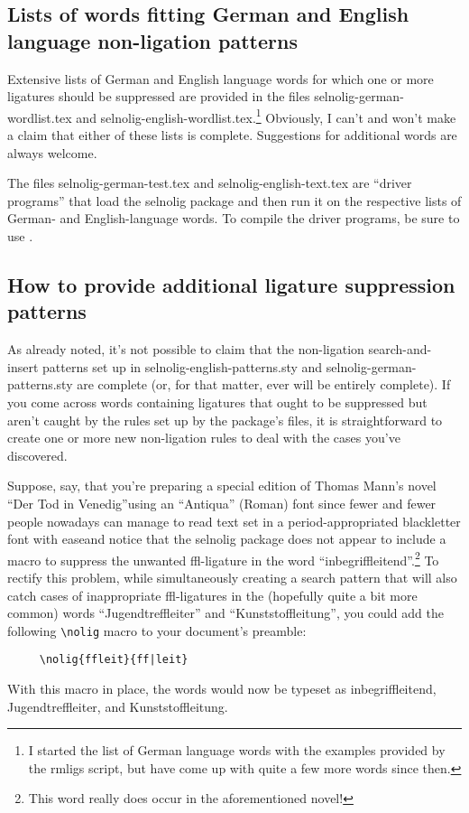 \documentclass[12pt]{article}
\newcommand{\pkg}[1]{\textsf{#1}}
\begin{document}
\subsection{Lists of words fitting German and English language non-ligation patterns}

Extensive lists of German and English language words for which one or more ligatures should be suppressed are provided in the files \pkg{selnolig-german-wordlist.tex} and \pkg{selnolig-english-wordlist.tex}.\footnote{I started the list of German language words with the examples provided by the \pkg{rmligs} script, but have come up with quite a few more words since then.} Obviously, I can't and won't make a claim that either of these lists is complete. Suggestions for additional words are always welcome.

The files \pkg{selnolig-german-test.tex} and \pkg{selnolig-english-text.tex} are \enquote{driver programs} that load the \pkg{selnolig} package and then run it on the respective lists of German- and English-language words. To compile the driver programs, be sure to use \LuaLaTeX.


\subsection{How to provide additional ligature suppression patterns}

As already noted, it's not possible to claim that the non-ligation search-and-insert patterns set up in \pkg{selnolig-english-patterns.sty} and \pkg{selnolig-german-patterns.sty} are complete (or, for that matter, ever will be entirely complete). If you come across words containing ligatures that ought to be suppressed but aren't caught by the rules set up by the package's files, it is straightforward to create one or more new non-ligation rules to deal with the cases you've discovered.

Suppose, say, that you're preparing a special edition of Thomas Mann's novel \enquote{Der Tod in Venedig}\textemdash using an \enquote{Antiqua} (Roman) font since fewer and fewer people nowadays can manage to read text set in a period-appropriated {\blackletterfont blackletter} font with ease\textemdash and notice that the \pkg{selnolig} package does not appear to include a macro to suppress the unwanted ffl-ligature in the word \enquote{inbegri\mbox{ffl}eitend}.\footnote{This word really does occur in the aforementioned novel!} To rectify this problem, while simultaneously creating a search pattern that will also catch cases of inappropriate ffl-ligatures in the (hopefully quite a bit more common) words  \enquote{Jugendtre\mbox{ffl}eiter} and \enquote{Kunststo\mbox{ffl}eitung}, you could add the following \Verb+\nolig+ macro to your document's preamble:
\begin{Verbatim}
     \nolig{ffleit}{ff|leit}
\end{Verbatim}
With this macro in place, the words would now be typeset as inbegriffleitend, Jugendtreffleiter, and Kunststoffleitung.
\end{document}
